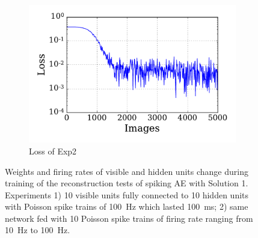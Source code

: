 \begin{figure}
\begin{subfigure}[t]{0.48\textwidth}
		\includegraphics[width=\textwidth]{pics_sdlm/01_exp_SAE_Orig_long/exp2_mse_nons.pdf}
		\caption{Loss of Exp2}
	\end{subfigure}
	\caption[SAE-S1 training of the reconstruction tests.]{Weights and firing rates of visible and hidden units change during training of the reconstruction tests of spiking AE with Solution 1. 
		Experiments 1) 10 visible units fully connected to 10 hidden units with Poisson spike trains of 100~Hz which lasted 100~ms; 2) same network fed with 10 Poisson spike trains of firing rate ranging from 10~Hz to 100~Hz.}
	\label{fig:sol1_ae}
\end{figure}

